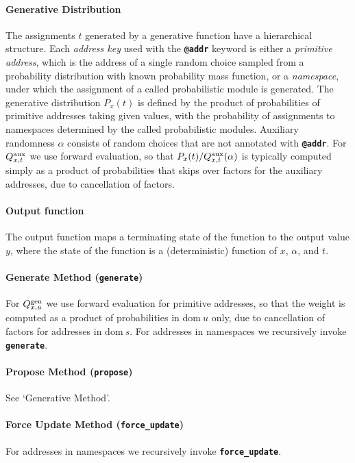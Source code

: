 \documentclass{article}
\newcommand{\code}[1]{\texttt{\small{\textbf{#1}}}}
\newcommand{\dom}[1]{\mbox{dom}{~#1}}
\newcommand{\gen}[0]{\mbox{\scriptsize gen}}
\newcommand{\auxassign}[0]{\alpha}
\newcommand{\aux}[0]{\mbox{\scriptsize aux}}
\begin{document}
\paragraph{Generative Distribution}
The assignments $t$ generated by a generative function have a hierarchical structure.
Each \emph{address key} used with the \code{@addr} keyword is either a \emph{primitive address}, which is the address of a single random choice sampled from a probability distribution with known probability mass function, or a \emph{namespace}, under which the assignment of a called probabilistic module is generated.
The generative distribution $P_x(t)$ is defined by the product of probabilities of primitive addresses taking given values, with the probability of assignments to namespaces determined by the called probabilistic modules.
Auxiliary randomness $\auxassign$ consists of random choices that are not annotated with \code{@addr}.
For $Q^{\aux}_{x,t}$ we use forward evaluation, so that $P_x(t) / Q^{\aux}_{x,t}(\auxassign)$ is typically computed simply as a product of probabilities that skips over factors for the auxiliary addresses, due to cancellation of factors.

\paragraph{Output function}
The output function maps a terminating state of the function to the output value $y$, where the state of the function is a (deterministic) function of $x$, $\auxassign$, and $t$.

\paragraph{Generate Method (\code{generate})}
For $Q^{\gen}_{x,u}$ we use forward evaluation for primitive addresses, so that the weight is computed as a product of probabilities in $\dom{u}$ only, due to cancellation of factors for addresses in $\dom{s}$.
For addresses in namespaces we recursively invoke \code{generate}.

\paragraph{Propose Method (\code{propose})}
See `Generative Method'.

\paragraph{Force Update Method (\code{force\_update})}
For addresses in namespaces we recursively invoke \code{force\_update}.
\end{document}
